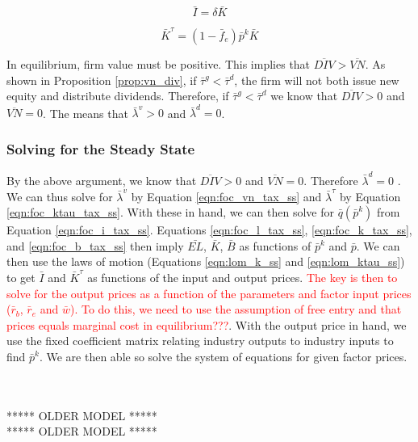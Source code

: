 \begin{equation}
\label{eqn:lom_k_ss}
\bar{I}=\delta\bar{K}
\end{equation}

\begin{equation}
\label{eqn:lom_ktau_ss}
\bar{K}^{\tau}=(1-\bar{f}_{e})\bar{p}^{k}\bar{K}
\end{equation}

In equilibrium, firm value must be positive.  This implies that $\overline{DIV}>\overline{VN}$.  As shown in Proposition \ref{prop:vn_div}, if $\bar{\tau}^{g}<\bar{\tau}^{d}$, the firm will not both issue new equity and distribute dividends.  Therefore, if $\bar{\tau}^{g}<\bar{\tau}^{d}$ we know that $\overline{DIV}>0$ and $\overline{VN}=0$.  The means that $\bar{\lambda}^{v}>0$ and $\bar{\lambda}^{d}=0$.  

\subsubsection{Solving for the Steady State}

By the above argument, we know that $\overline{DIV}>0$ and $\overline{VN}=0$.  Therefore $\bar{\lambda}^{d}=0$ .  We can thus solve for $\bar{\lambda}^{v}$ by Equation \ref{eqn:foc_vn_tax_ss} and $\bar{\lambda}^{\tau}$ by Equation \ref{eqn:foc_ktau_tax_ss}.  With these in hand, we can then solve for $\bar{q}(\bar{p}^{k})$ from Equation \ref{eqn:foc_i_tax_ss}.  Equations \ref{eqn:foc_l_tax_ss}, \ref{eqn:foc_k_tax_ss}, and \ref{eqn:foc_b_tax_ss} then imply $\bar{EL}$, $\bar{K}$, $\bar{B}$ as functions of $\bar{p}^{k}$ and $\bar{p}$.    We can then use the laws of motion (Equations \ref{eqn:lom_k_ss} and \ref{eqn:lom_ktau_ss}) to get $\bar{I}$ and $\bar{K}^{\tau}$ as functions of the input and output prices.  \textcolor{red}{The key is then to solve for the output prices as a function of the parameters and factor input prices ($\bar{r}_{b}$, $\bar{r}_{e}$ and $\bar{w}$).  To do this, we need to use the assumption of free entry and that prices equals marginal cost in equilibrium???}.  With the output price in hand, we use the fixed coefficient matrix relating industry outputs to industry inputs to find $\bar{p}^{k}$.  We are then able so solve the system of equations for given factor prices.  

\ \\
\ \\
***** OLDER MODEL *****\\
***** OLDER MODEL *****\\
\ \\
\ \\

